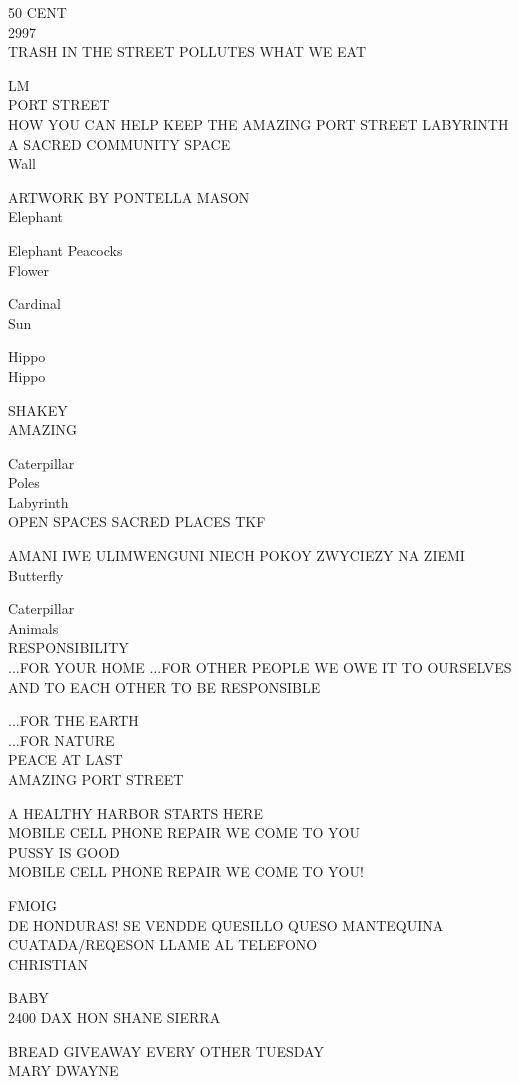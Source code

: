 \documentclass[10pt,letterpaper]{article}
\begin{document}
50 CENT\\
2997\\
TRASH IN THE STREET POLLUTES WHAT WE EAT

LM\\
PORT STREET\\
HOW YOU CAN HELP KEEP THE AMAZING PORT STREET LABYRINTH A SACRED COMMUNITY SPACE\\
Wall

ARTWORK BY PONTELLA MASON\\
Elephant

Elephant Peacocks\\
Flower

Cardinal\\
Sun

Hippo\\
Hippo

SHAKEY\\
AMAZING

Caterpillar\\
Poles\\
Labyrinth\\
OPEN SPACES SACRED PLACES TKF

AMANI IWE ULIMWENGUNI NIECH POKOY ZWYCIEZY NA ZIEMI\\
Butterfly

Caterpillar\\
Animals\\
RESPONSIBILITY\\
...FOR YOUR HOME ...FOR OTHER PEOPLE WE OWE IT TO OURSELVES AND TO EACH OTHER TO BE RESPONSIBLE

...FOR THE EARTH\\
...FOR NATURE\\
PEACE AT LAST\\
AMAZING PORT STREET

A HEALTHY HARBOR STARTS HERE\\
MOBILE CELL PHONE REPAIR WE COME TO YOU\\
PUSSY IS GOOD\\
MOBILE CELL PHONE REPAIR WE COME TO YOU!

FMOIG\\
DE HONDURAS!  SE VENDDE QUESILLO QUESO MANTEQUINA CUATADA/REQESON LLAME AL TELEFONO\\
CHRISTIAN

BABY\\
2400 DAX HON SHANE SIERRA

BREAD GIVEAWAY EVERY OTHER TUESDAY\\
MARY DWAYNE
\end{document}
